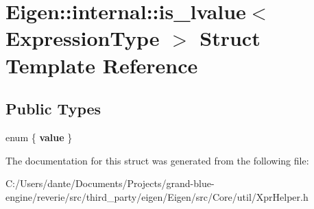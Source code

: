 \hypertarget{struct_eigen_1_1internal_1_1is__lvalue}{}\section{Eigen\+::internal\+::is\+\_\+lvalue$<$ Expression\+Type $>$ Struct Template Reference}
\label{struct_eigen_1_1internal_1_1is__lvalue}
\subsection*{Public Types}
\begin{DoxyCompactItemize}
\item 
\mbox{\label{struct_eigen_1_1internal_1_1is__lvalue_a3f74c671049bff656772b91bd3f19ea7}} 
enum \{ {\bfseries value}
 \}
\end{DoxyCompactItemize}


The documentation for this struct was generated from the following file\+:\begin{DoxyCompactItemize}
\item 
C\+:/\+Users/dante/\+Documents/\+Projects/grand-\/blue-\/engine/reverie/src/third\+\_\+party/eigen/\+Eigen/src/\+Core/util/Xpr\+Helper.\+h\end{DoxyCompactItemize}
